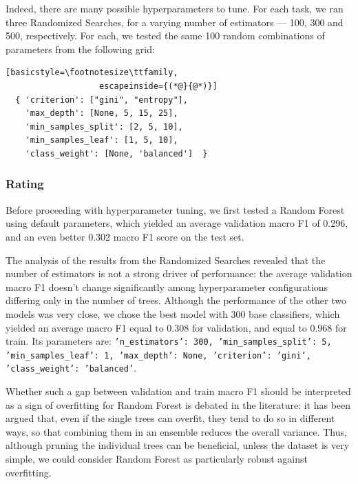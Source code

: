 Indeed, there are many possible hyperparameters to tune. For each task, we ran three Randomized Searches, for a varying number of estimators — 100, 300 and 500, respectively. For each, we tested the same 100 random combinations of parameters from the following grid:
\begin{lstlisting}[basicstyle=\footnotesize\ttfamily,
                   escapeinside={(*@}{@*)}]
  { 'criterion': ["gini", "entropy"],
    'max_depth': [None, 5, 15, 25],
    'min_samples_split': [2, 5, 10],
    'min_samples_leaf': [1, 5, 10],
    'class_weight': [None, 'balanced']  }
\end{lstlisting}

\subsubsection{Rating}
Before proceeding with hyperparameter tuning, we first tested a Random Forest using default parameters, which yielded an average validation macro F1 of 0.296, and an even better 0.302 macro F1 score on the test set.

The analysis of the results from the Randomized Searches revealed that the number of estimators is not a strong driver of performance: the average validation macro F1 doesn't change significantly among hyperparameter configurations differing only in the number of trees. Although the performance of the other two models was very close, we chose the best model with 300 base classifiers, which yielded an average macro F1 equal to 0.308 for validation, and equal to 0.968 for train. Its parameters are: \texttt{{'n\_estimators': 300, 'min\_samples\_split': 5, 'min\_samples\_leaf': 1, 'max\_depth': None, 'criterion': 'gini', 'class\_weight': 'balanced'}}.



Whether such a gap between validation and train macro F1 should be interpreted as a sign of overfitting for Random Forest is debated in the literature: it has been argued that, even if the single trees can overfit, they tend to do so in different ways, so that combining them in an ensemble reduces the overall variance. Thus, although pruning the individual trees can be beneficial, unless the dataset is very simple, we could consider Random Forest as particularly robust against overfitting.

